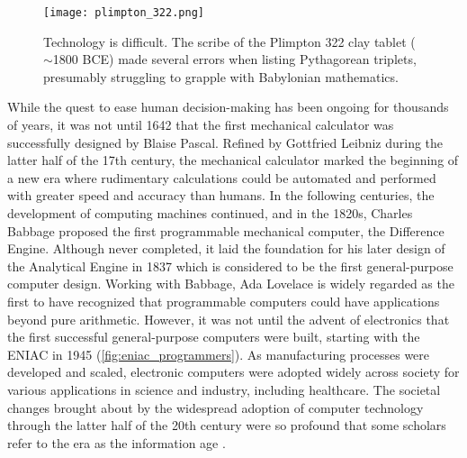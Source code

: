 \begin{figure}[t]
    \centering
    \texttt{[image: plimpton\_322.png]}
    \caption{Technology is difficult. The scribe of the Plimpton 322 clay tablet ($\sim$1800 BCE) made several errors when listing Pythagorean triplets, presumably struggling to grapple with Babylonian mathematics. \cite[photo credit]{neugebauer_mathematical_1945}}
    \label{fig:plimpton_332}
\end{figure}

While the quest to ease human decision-making has been ongoing for thousands of years, it was not until 1642 that the first mechanical calculator was successfully designed by Blaise Pascal. Refined by Gottfried Leibniz during the latter half of the 17th century, the mechanical calculator marked the beginning of a new era where rudimentary calculations could be automated and performed with greater speed and accuracy than humans. 
In the following centuries, the development of computing machines continued, and in the 1820s, Charles Babbage proposed the first programmable mechanical computer, the Difference Engine. Although never completed, it laid the foundation for his later design of the Analytical Engine in 1837 which is considered to be the first general-purpose computer design. 
Working with Babbage, Ada Lovelace is widely regarded as the first to have recognized that programmable computers could have applications beyond pure arithmetic. However, it was not until the advent of electronics that the first successful general-purpose computers were built, starting with the ENIAC in 1945 (\cref{fig:eniac_programmers}).
As manufacturing processes were developed and scaled, electronic computers were adopted widely across society for various applications in science and industry, including healthcare. 
The societal changes brought about by the widespread adoption of computer technology through the latter half of the 20th century were so profound that some scholars refer to the era as the information age \cite{georges_universal_2001, harari_sapiens_2011}.

